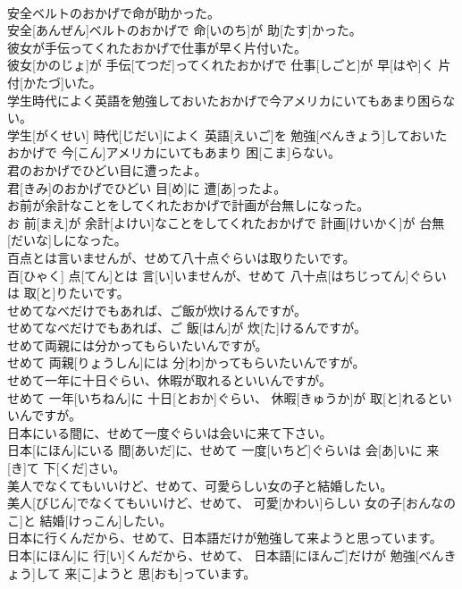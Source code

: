 \documentclass[8pt]{extreport}
\begin{document}
\begin{CJK}{UTF8}{min}
\\	安全ベルトのおかげで命が助かった。	
\\	安全[あんぜん]ベルトのおかげで 命[いのち]が 助[たす]かった。
\\	彼女が手伝ってくれたおかげで仕事が早く片付いた。	
\\	彼女[かのじょ]が 手伝[てつだ]ってくれたおかげで 仕事[しごと]が 早[はや]く 片付[かたづ]いた。
\\	学生時代によく英語を勉強しておいたおかげで今アメリカにいてもあまり困らない。	
\\	学生[がくせい] 時代[じだい]によく 英語[えいご]を 勉強[べんきょう]しておいたおかげで 今[こん]アメリカにいてもあまり 困[こま]らない。
\\	君のおかげでひどい目に遭ったよ。	
\\	君[きみ]のおかげでひどい 目[め]に 遭[あ]ったよ。
\\	お前が余計なことをしてくれたおかげで計画が台無しになった。	
\\	お 前[まえ]が 余計[よけい]なことをしてくれたおかげで 計画[けいかく]が 台無[だいな]しになった。
\\	百点とは言いませんが、せめて八十点ぐらいは取りたいです。	
\\	百[ひゃく] 点[てん]とは 言[い]いませんが、せめて 八十点[はちじってん]ぐらいは 取[と]りたいです。
\\	せめてなべだけでもあれば、ご飯が炊けるんですが。	
\\	せめてなべだけでもあれば、ご 飯[はん]が 炊[た]けるんですが。
\\	せめて両親には分かってもらいたいんですが。	
\\	せめて 両親[りょうしん]には 分[わ]かってもらいたいんですが。
\\	せめて一年に十日ぐらい、休暇が取れるといいんですが。	
\\	せめて 一年[いちねん]に 十日[とおか]ぐらい、 休暇[きゅうか]が 取[と]れるといいんですが。
\\	日本にいる間に、せめて一度ぐらいは会いに来て下さい。	
\\	日本[にほん]にいる 間[あいだ]に、せめて 一度[いちど]ぐらいは 会[あ]いに 来[き]て 下[くだ]さい。
\\	美人でなくてもいいけど、せめて、可愛らしい女の子と結婚したい。	
\\	美人[びじん]でなくてもいいけど、せめて、 可愛[かわい]らしい 女の子[おんなのこ]と 結婚[けっこん]したい。
\\	日本に行くんだから、せめて、日本語だけが勉強して来ようと思っています。	
\\	日本[にほん]に 行[い]くんだから、せめて、 日本語[にほんご]だけが 勉強[べんきょう]して 来[こ]ようと 思[おも]っています。

\end{CJK}
\end{document}
